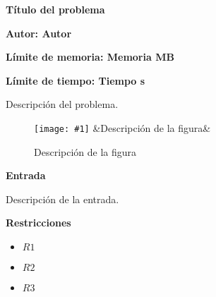 \documentclass{article}
\newenvironment{ConstraintList}
{
	\vspace{-2mm}
	\begin{itemize}
}
{
	\end{itemize}
}
\newcommand{\spanishProblemHeader}[4]{
	\begin{center} {\huge \sf \bfseries #1} \end{center}
	\vspace{-2mm}
	\centerline{\sf \bfseries Autor: #2}
	\vspace{1mm}
	\centerline{\sf \bfseries Límite de memoria: #3}
	\vspace{1mm}
	\centerline{\sf \bfseries Límite de tiempo: #4}
	\vspace{10mm}
}
\newcommand{\printSubtitle}[1]{
	\vspace{1mm}
	\begin{flushleft} {\Large \sf \bfseries #1 \newline} \end{flushleft}
	\vspace{-4mm}
}
\newcommand{\image}[4]{
	\begin{figure}[h]
		\centering
		\texttt{[image: \#1]}
		\ifx&#4&\empty
		\else
			\caption{#4}
		\fi
	\end{figure}
}
\begin{document}


\spanishProblemHeader{Título del problema}{Autor}{Memoria MB}{Tiempo s}




Descripción del problema.
\newline

\image{images/figure-1.png}{9.6cm}{8cm}{Descripción de la figura}




\printSubtitle{Entrada}

Descripción de la entrada.
\newline




\printSubtitle{Restricciones}

\begin{ConstraintList}
	\item $ R1 $
	\item $ R2 $
	\item $ R3 $
\end{ConstraintList}
\end{document}
